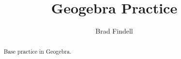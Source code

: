\documentclass[nooutcomes]{ximera}
\title{Geogebra Practice}
\author{Brad Findell}
\begin{document}
\begin{abstract}
Base practice in Geogebra. 
\end{abstract}
\maketitle
\end{document}
